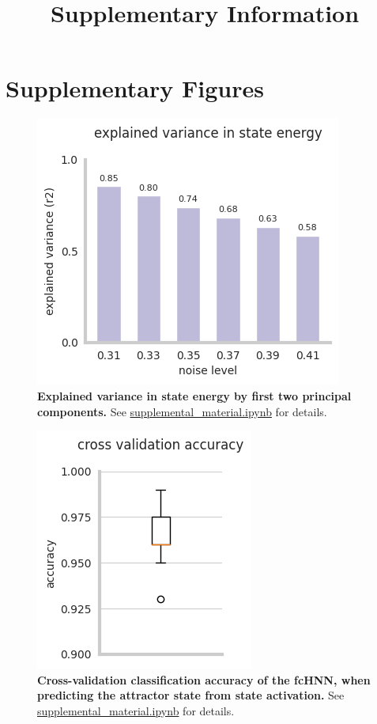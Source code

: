\documentclass{article}
\title{Supplementary Information}
\date{\displaydate{articleDate}}
\author{}
\begin{document}
\maketitle


\keywords{}

\section{Supplementary Figures}

\begin{figure}[!htbp]
\centering
\includegraphics[width=0.7\linewidth]{files/expl_variance_energy-5fedb93b94285d86ac14bd9537b3ab04.png}
\caption[]{\textbf{Explained variance in state energy by first two principal components.} See \href{https://github.com/pni-lab/connattractor/blob/master/notebooks/supplemental\_material.ipynb}{supplemental\_material.ipynb} for details.}
\label{si_expl_variance_energy}
\end{figure}

\begin{figure}[!htbp]
\centering
\includegraphics[width=0.7\linewidth]{files/classification_acc_s-3a5c0a3497ab2416e5d51f061ae45674.png}
\caption[]{\textbf{Cross-validation classification accuracy of the fcHNN, when predicting the attractor state from state
activation.}  See \href{https://github.com/pni-lab/connattractor/blob/master/notebooks/supplemental\_material.ipynb}{supplemental\_material.ipynb} for details.}
\label{si_classification_acc_state_basins}
\end{figure}
\end{document}
